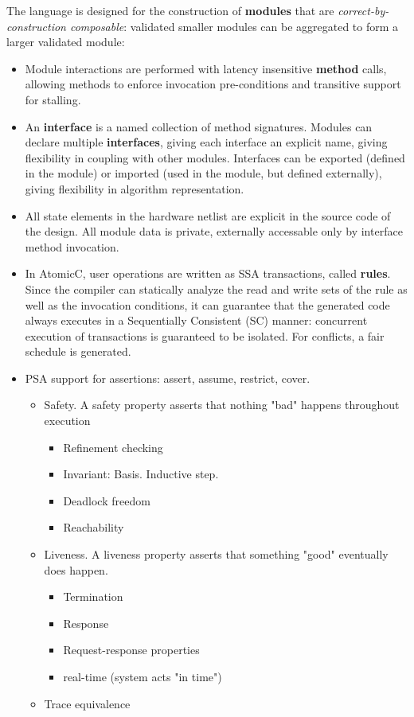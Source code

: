 The language is designed for
the construction of \textbf{modules} that are \textit{correct-by-construction composable}:
validated smaller modules can be aggregated to form
a larger validated module:
\begin{itemize}

\item Module interactions are performed with
latency insensitive
\textbf{method} calls, allowing methods to enforce invocation pre-conditions
and transitive support for stalling.

\item An \textbf{interface} is a named collection of method signatures.
Modules can declare
multiple \textbf{interfaces}, giving each interface an explicit name,
giving flexibility in coupling with other modules.
Interfaces can be exported (defined in the module) or imported (used in
the module, but defined externally), giving flexibility in algorithm
representation.

\item All state elements in the hardware
netlist are explicit in the source code of the design.
All module data is private, externally accessable only by interface method invocation.

\item In AtomicC, user operations are written as SSA transactions, called \textbf{rules}.  Since the
compiler can statically analyze the read and write sets of the rule as well as the
invocation conditions, it can guarantee that the generated code always executes
in a Sequentially Consistent (SC) manner: concurrent execution of transactions is
guaranteed to be isolated.  For conflicts, a fair schedule is generated.

\item PSA support for assertions: assert, assume, restrict, cover.
\begin{itemize}
\item Safety. A safety property asserts that nothing "bad" happens throughout execution
\begin{itemize}
\item Refinement checking
\item Invariant:  Basis.  Inductive step.
\item Deadlock freedom
\item Reachability
\end{itemize}
\item Liveness. A liveness property asserts that something "good" eventually does happen.
\begin{itemize}
\item Termination
\item Response
\item Request-response properties
\item real-time (system acts "in time")
\end{itemize}
\item Trace equivalence
\end{itemize}


\end{itemize}
